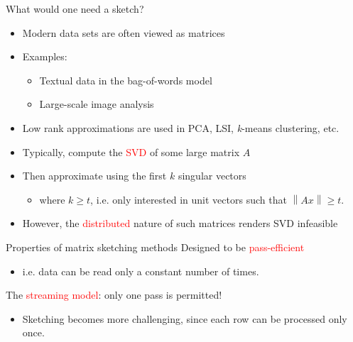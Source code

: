 \documentclass[first=dgreen,second=purple,logo=redque]{aaltoslides}
\newcommand{\vectornorm}[1]{\left\|#1\right\|}
\begin{document}
\begin{frame}[allowframebreaks=1]{What would one need a sketch?}
\begin{itemize}
  \item Modern data sets are often viewed as \textcolor{dgreen}{matrices}
  \item{Examples:}
  \begin{itemize}
    \item Textual data in the bag-of-words model %
    \item Large-scale image analysis %
  \end{itemize}
  \item Low rank approximations are used in PCA, LSI, \textit{k}-means clustering, etc.


  \item Typically, compute the \textcolor{red}{SVD} of some large matrix $A$
  \item Then \textcolor{dgreen}{approximate} using the first $k$ singular vectors
  \begin{itemize}
     \item where $k \geq t$, i.e. only interested in unit vectors such
     that $\vectornorm{Ax} \geq t$.
  \end{itemize}
  \item However, the \textcolor{red}{distributed} nature of such matrices renders SVD \textcolor{dgreen}{infeasible}
\end{itemize}

\end{frame}




\begin{frame}{Properties of matrix sketching methods}
Designed to be \textcolor{red}{pass-efficient}
\begin{itemize}
\item i.e. data can be read only a \textcolor{dgreen}{constant} number of times.
\end{itemize}
The \textcolor{red}{streaming model}: \textcolor{dgreen}{only one} pass is permitted!
\begin{itemize}
\item Sketching becomes more challenging, since each row can be processed only
once. %
\end{itemize}

\end{frame}
\end{document}
